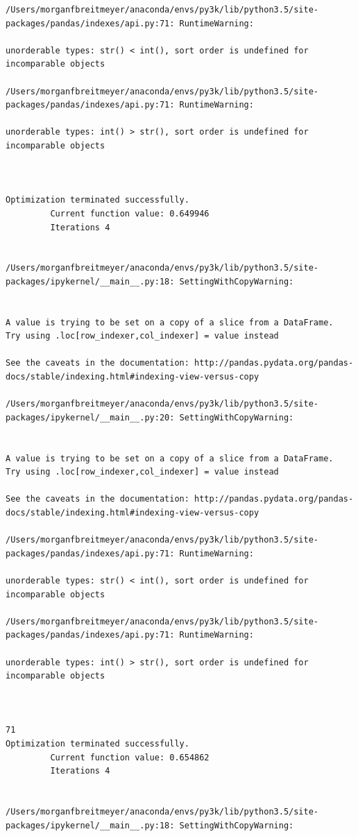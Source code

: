 \begin{lstlisting}
/Users/morganfbreitmeyer/anaconda/envs/py3k/lib/python3.5/site-packages/pandas/indexes/api.py:71: RuntimeWarning:

unorderable types: str() < int(), sort order is undefined for incomparable objects

/Users/morganfbreitmeyer/anaconda/envs/py3k/lib/python3.5/site-packages/pandas/indexes/api.py:71: RuntimeWarning:

unorderable types: int() > str(), sort order is undefined for incomparable objects



Optimization terminated successfully.
         Current function value: 0.649946
         Iterations 4


/Users/morganfbreitmeyer/anaconda/envs/py3k/lib/python3.5/site-packages/ipykernel/__main__.py:18: SettingWithCopyWarning:


A value is trying to be set on a copy of a slice from a DataFrame.
Try using .loc[row_indexer,col_indexer] = value instead

See the caveats in the documentation: http://pandas.pydata.org/pandas-docs/stable/indexing.html#indexing-view-versus-copy

/Users/morganfbreitmeyer/anaconda/envs/py3k/lib/python3.5/site-packages/ipykernel/__main__.py:20: SettingWithCopyWarning:


A value is trying to be set on a copy of a slice from a DataFrame.
Try using .loc[row_indexer,col_indexer] = value instead

See the caveats in the documentation: http://pandas.pydata.org/pandas-docs/stable/indexing.html#indexing-view-versus-copy

/Users/morganfbreitmeyer/anaconda/envs/py3k/lib/python3.5/site-packages/pandas/indexes/api.py:71: RuntimeWarning:

unorderable types: str() < int(), sort order is undefined for incomparable objects

/Users/morganfbreitmeyer/anaconda/envs/py3k/lib/python3.5/site-packages/pandas/indexes/api.py:71: RuntimeWarning:

unorderable types: int() > str(), sort order is undefined for incomparable objects



71
Optimization terminated successfully.
         Current function value: 0.654862
         Iterations 4


/Users/morganfbreitmeyer/anaconda/envs/py3k/lib/python3.5/site-packages/ipykernel/__main__.py:18: SettingWithCopyWarning:



\end{lstlisting}
